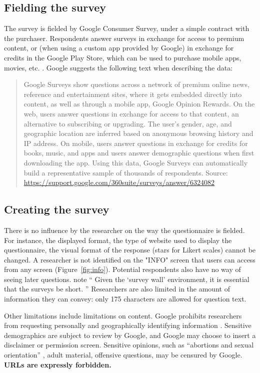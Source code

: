 
\subsection{Fielding the survey}
The survey is fielded by Google Consumer Survey, under a simple contract with the purchaser. Respondents answer surveys in exchange for access to premium content, or (when using a custom app provided by Google) in exchange for credits in the Google Play Store, which can be used to purchase mobile apps, movies, etc. \citep{Google_Inc2016-fj}. Google suggests the following text when describing the data:
\begin{quotation}
	Google Surveys show questions across a network of premium online news, reference and entertainment sites, where it gets embedded directly into content, as well as through a mobile app, Google Opinion Rewards. On the web, users answer questions in exchange for access to that content, an alternative to subscribing or upgrading. The user's gender, age, and geographic location are inferred based on anonymous browsing history and IP address. On mobile, users answer questions in exchange for credits for books, music, and apps and users answer demographic questions when first downloading the app. Using this data, Google Surveys can automatically build a representative sample of thousands of respondents.
	{\footnotesize{Source: \url{https://support.google.com/360suite/surveys/answer/6324082}}}
\end{quotation}

\subsection{Creating the survey}
There is no influence by the researcher on the way the questionnaire is fielded. For instance, the displayed format, the type of website used to display the questionnaire, the visual format of the response (stars for Likert scales) cannot be changed. A researcher is not identified on the "INFO" screen that users can access from any screen (Figure~\ref{fig:info}). Potential respondents also have no way of seeing later questions.  \cite{doi:10.1093/pan/mpw016} note `` Given the  `survey wall' environment, it is essential that the surveys be short. ''  Researchers are also limited in the amount of information they can convey: only 175 characters are allowed for question text.

Other limitations include limitations on content. Google prohibits researchers from requesting personally and geographically identifying information \citep{Google_Inc2017-wi}. Sensitive demographics are subject to review by Google, and Google may choose to insert a disclaimer or permission screen. Sensitive opinions, such as ``abortions and sexual orientation'' \citep{Google_Inc2017-wi}, adult material, offensive questions,  may be censured by Google. 
\textbf{URLs are expressly forbidden.} 


